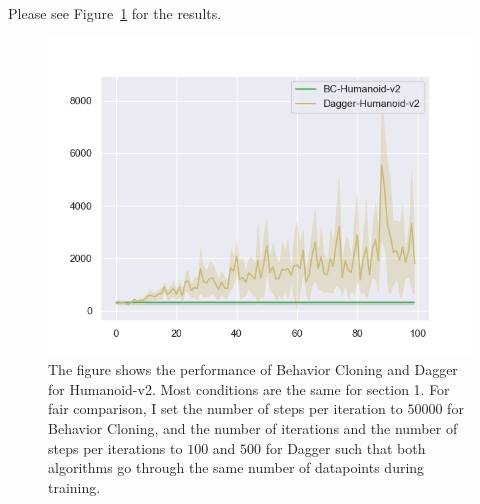 Please see Figure~\ref{fig:2-2} for the results.
\begin{figure}[htbp]
\centering
\includegraphics[width=0.7\linewidth]{figures/figure-2-2.png}
\caption{The figure shows the performance of Behavior Cloning and Dagger for Humanoid-v2. Most conditions are the same for section 1. For fair comparison, I set the number of steps per iteration to $50000$ for Behavior Cloning, and the number of iterations and the number of steps per iterations to $100$ and $500$ for Dagger such that both algorithms go through the same number of datapoints during training.}
\label{fig:2-2}
\end{figure}